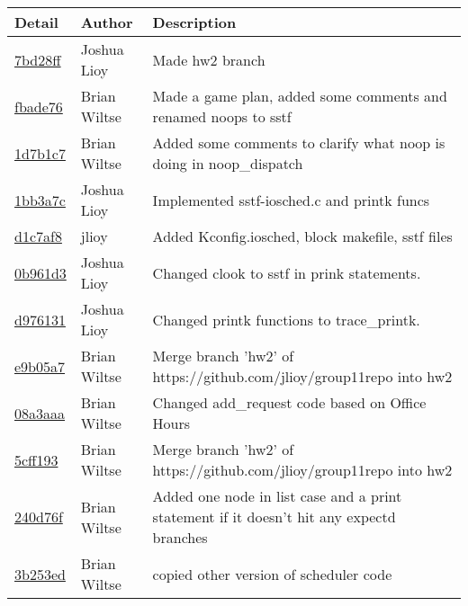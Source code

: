 \begin{tabular}{l l l}\textbf{Detail} & \textbf{Author} & \textbf{Description}\\\hline
\href{https://github.com/jlioy/group11repo/commit/7bd28ff26263ee4da5dd2aaa8bf2172f9798a598}{7bd28ff} & Joshua Lioy & Made hw2 branch\\\hline
\href{https://github.com/jlioy/group11repo/commit/fbade76f21705bad2b3678906f362a5d55593424}{fbade76} & Brian Wiltse & Made a game plan, added some comments and renamed noops to sstf\\\hline
\href{https://github.com/jlioy/group11repo/commit/1d7b1c70a198868135bd047aaca6ddebf4f91856}{1d7b1c7} & Brian Wiltse & Added some comments to clarify what noop is doing in noop\_dispatch\\\hline
\href{https://github.com/jlioy/group11repo/commit/1bb3a7c658c0aee0efc4a282aecf0b40b814e069}{1bb3a7c} & Joshua Lioy & Implemented sstf-iosched.c and printk funcs\\\hline
\href{https://github.com/jlioy/group11repo/commit/d1c7af823dfe35e18409b99bd83d24c69a6e51ce}{d1c7af8} & jlioy & Added Kconfig.iosched, block makefile, sstf files\\\hline
\href{https://github.com/jlioy/group11repo/commit/0b961d3e8526e7a3ffcb8673453f7b8075ac887f}{0b961d3} & Joshua Lioy & Changed clook to sstf in prink statements.\\\hline
\href{https://github.com/jlioy/group11repo/commit/d9761315ab967a6174919453f579251b06e76c56}{d976131} & Joshua Lioy & Changed printk functions to trace\_printk.\\\hline
\href{https://github.com/jlioy/group11repo/commit/e9b05a7cfbbd58aeb7ac8043a3200931f97936ca}{e9b05a7} & Brian Wiltse & Merge branch 'hw2' of https://github.com/jlioy/group11repo into hw2\\\hline
\href{https://github.com/jlioy/group11repo/commit/08a3aaa06b6ecc9b1c669ae563d6cfb21e9c36a3}{08a3aaa} & Brian Wiltse & Changed add\_request code based on Office Hours\\\hline
\href{https://github.com/jlioy/group11repo/commit/5cff193975d6fa66a4e5bfa7f81d6012dacb7bf8}{5cff193} & Brian Wiltse & Merge branch 'hw2' of https://github.com/jlioy/group11repo into hw2\\\hline
\href{https://github.com/jlioy/group11repo/commit/240d76fb7828d43e980415b36db95dec7b6a84c3}{240d76f} & Brian Wiltse & Added one node in list case and a print statement if it doesn't hit any expectd branches\\\hline
\href{https://github.com/jlioy/group11repo/commit/3b253ed33d2784f6c2aae727464ce2c157bff871}{3b253ed} & Brian Wiltse & copied other version of scheduler code\\\hline\end{tabular}
